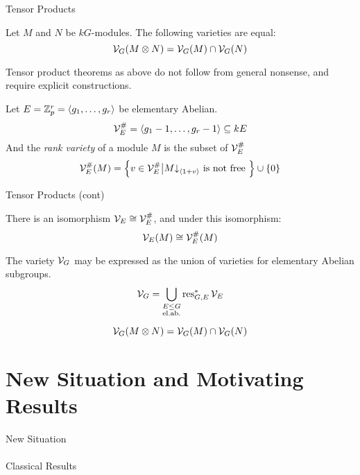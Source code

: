 \documentclass{beamer}
\newcommand{\sectionframe}[1]{\begin{frame}\begin{center}{\Huge #1 }\end{center}\end{frame}}
\begin{document}
    \begin{frame}{Tensor Products}
      \pause
      \begin{theorem}
        Let $M$ and $N$ be $kG$-modules. The following varieties are equal:
        \[
          \mathcal{V}_G(M \otimes N) = \mathcal{V}_G(M) \cap \mathcal{V}_G(N)
        \]
      \end{theorem}
      \pause
      Tensor product theorems as above do not follow from general nonsense, and require explicit constructions.
      \pause
      \begin{definition}
        Let $E = \mathbb{Z}_p^r = \left< g_1,\ldots,g_r\right>$ be elementary Abelian.%
        \[
          \mathcal{V}_E^\# = \left<g_1 - 1, \ldots, g_r - 1\right> \subseteq kE
        \]
        And the \emph{rank variety} of a module $M$ is the subset of $\mathcal{V}_E^\#$
        \[
          \mathcal{V}_E^\#(M) = \left\{ v \in \mathcal{V}_E^\# \big| M\mathord{\downarrow}_{\left<1 + v\right>} \text{ is not free }  \right\} \cup \left\{ 0 \right\}
        \]
        
      \end{definition}
    \end{frame}

    \begin{frame}{Tensor Products (cont)}
      \pause
      \begin{theorem}
        There is an isomorphism $\mathcal{V}_E \cong \mathcal{V}_E^\#$, and under this isomorphism:
        \[
          \mathcal{V}_E(M) \cong \mathcal{V}_E^\#(M)
        \]
      \end{theorem}
      \pause
      \begin{theorem}[Quillen]
        The variety $\mathcal{V}_G$ may be expressed as the union of varieties for elementary Abelian subgroups.
        \[
          \mathcal{V}_G = \bigcup_{\substack{E \leq G \\ \text{el.ab.}}} \operatorname{res}_{G,E}^* \mathcal{V}_E
        \]
      \end{theorem}
      \pause
      \begin{corollary}
        \[\mathcal{V}_G(M \otimes N) = \mathcal{V}_G(M) \cap \mathcal{V}_G(N)\]
      \end{corollary}
    \end{frame}
\section[LSAs \& $\H^\bullet$]{New Situation and Motivating Results}

\sectionframe{New Situation {\small ~ \\ ~ \\ Classical Results}}
\end{document}

